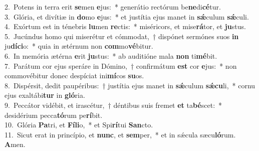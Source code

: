 {2.~}Potens in terra erit \textbf{se}men \textbf{e}jus:~* generátio rectórum be\textbf{ne}di\textbf{cé}tur.\\
{3.~}Glória, et divítiæ in \textbf{do}mo \textbf{e}jus:~* et justítia ejus manet in \textbf{sǽ}culum \textbf{sǽ}culi.\\
{4.~}Exórtum est in ténebris \textbf{lu}men \textbf{re}ctis:~* miséricors, et mise\textbf{rá}tor, et \textbf{ju}stus.\\
{5.~}Jucúndus homo qui miserétur et cómmodat,~† dispónet sermónes suos \textbf{in} ju\textbf{dí}\textbf{ci}o:~* quia in ætérnum non \textbf{com}mo\textbf{vé}bitur.\\
{6.~}In memória ætérna \textbf{e}rit \textbf{ju}stus:~* ab auditióne mala \textbf{non} ti\textbf{mé}bit.\\
{7.~}Parátum cor ejus speráre in Dómino,~† confirmátum \textbf{est} cor \textbf{e}jus:~* non commovébitur donec despíciat ini\textbf{mí}cos \textbf{su}os.\\
{8.~}Dispérsit, dedit paupéribus:~† justítia ejus manet in \textbf{sǽ}culum \textbf{sǽ}\textbf{cu}li,~* cornu ejus exaltábi\textbf{tur} in \textbf{gló}ria.\\
{9.~}Peccátor vidébit, et irascétur,~† déntibus suis fremet \textbf{et} ta\textbf{bé}scet:~* desidérium pecca\textbf{tó}rum pe\textbf{rí}bit.\\
{10.~}Glória \textbf{Pa}tri, et \textbf{Fí}\textbf{li}o,~* et Spi\textbf{rí}tui \textbf{San}cto.\\
{11.~}Sicut erat in princípio, et \textbf{nunc}, et \textbf{sem}per,~* et in sǽcula sæcu\textbf{ló}rum. \textbf{A}men.\\
